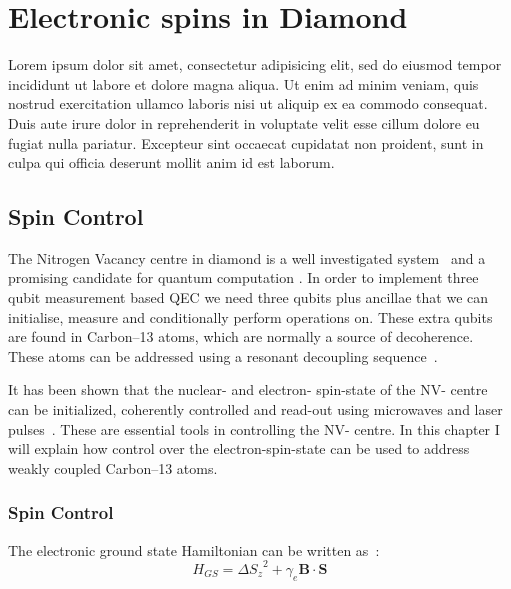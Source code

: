 \chapter{Electronic spins in Diamond}
Lorem ipsum dolor sit amet, consectetur adipisicing elit, sed do eiusmod
tempor incididunt ut labore et dolore magna aliqua. Ut enim ad minim veniam,
quis nostrud exercitation ullamco laboris nisi ut aliquip ex ea commodo
consequat. Duis aute irure dolor in reprehenderit in voluptate velit esse
cillum dolore eu fugiat nulla pariatur. Excepteur sint occaecat cupidatat non
proident, sunt in culpa qui officia deserunt mollit anim id est laborum.

\section{Spin Control}
\label{controlingspinsindiamond}


The Nitrogen Vacancy centre in diamond is a well investigated system~\citep{Doherty2013NitrogenVacancy} and a promising candidate for quantum computation \citep{Childress2013Diamond}. In order to implement three qubit measurement based QEC we need three qubits plus ancillae that we can initialise, measure and conditionally perform operations on. These extra qubits are found in Carbon--13 atoms, which are normally a source of decoherence. These atoms can be addressed using a resonant decoupling sequence~\citep{Taminiau2012Detectiona}.

It has been shown that the nuclear- and electron- spin-state of the NV- centre can be initialized, coherently controlled and read-out using microwaves and laser pulses~\citep{Robledo2011HighFidelity}. These are essential tools in controlling the NV- centre. In this chapter I will explain how control over the electron-spin-state can be used to address weakly coupled Carbon--13 atoms.

\subsection{Spin Control}
\label{spincontrol}

The electronic ground state Hamiltonian can be written as~\citep{Pfaff2013Quantum}:
 \begin{equation}
H_{GS} = \Delta {S_z}^2 + \gamma_e \mathbf{B} \cdot \mathbf{S}
\end{equation}


